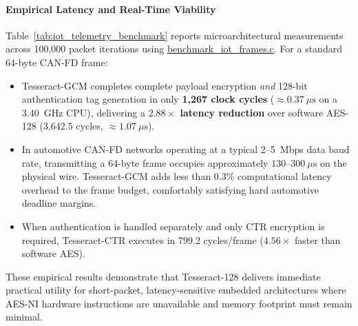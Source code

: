 \documentclass[10pt,twocolumn]{article}
\begin{document}
\begin{table}[htbp]
\caption{Empirical short-packet execution latency across telemetry frame sizes (100,000 iterations, 13th Gen Intel Core @ 3.40~GHz).}
\label{tab:iot_telemetry_benchmark}
\centering
\small
{}
\end{table}

\paragraph{Empirical Latency and Real-Time Viability}
Table~\ref{tab:iot_telemetry_benchmark} reports microarchitectural measurements across 100,000 packet iterations using \url{benchmark_iot_frames.c}. For a standard 64-byte CAN-FD frame:
\begin{itemize}
    \item Tesseract-GCM completes complete payload encryption \emph{and} 128-bit authentication tag generation in only \textbf{1,267 clock cycles} ($\approx 0.37~\mu\text{s}$ on a 3.40~GHz CPU), delivering a \textbf{$2.88\times$ latency reduction} over software AES-128 (3,642.5 cycles, $\approx 1.07~\mu\text{s}$).
    \item In automotive CAN-FD networks operating at a typical 2--5~Mbps data baud rate, transmitting a 64-byte frame occupies approximately $130$--$300~\mu\text{s}$ on the physical wire. Tesseract-GCM adds less than $0.3\%$ computational latency overhead to the frame budget, comfortably satisfying hard automotive deadline margins.
    \item When authentication is handled separately and only CTR encryption is required, Tesseract-CTR executes in 799.2 cycles/frame ($4.56\times$ faster than software AES).
\end{itemize}
These empirical results demonstrate that Tesseract-128 delivers immediate practical utility for short-packet, latency-sensitive embedded architectures where AES-NI hardware instructions are unavailable and memory footprint must remain minimal.
\end{document}
